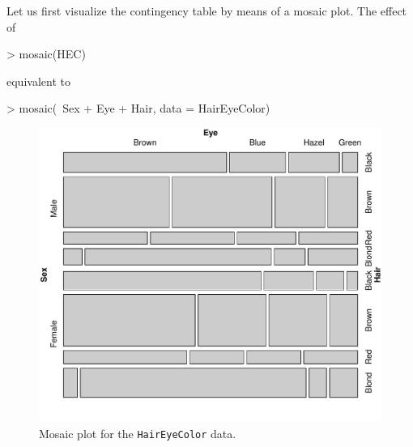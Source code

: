 \documentclass{Z}
\newcommand{\data}[1]{\texttt{#1}}
\begin{document}
Let us first visualize the contingency table by means of a mosaic plot.
The effect of

\begin{Schunk}
\begin{Sinput}
> mosaic(HEC)
\end{Sinput}
\end{Schunk}

\noindent equivalent to

\begin{Schunk}
\begin{Sinput}
> mosaic(~Sex + Eye + Hair, data = HairEyeColor)
\end{Sinput}
\end{Schunk}

\begin{figure}[p]
\begin{center}
\includegraphics{strucplot-Observedfig}
\caption{Mosaic plot for the \data{HairEyeColor} data.}
\label{fig:observed}
\end{center}
\end{figure}
\end{document}
